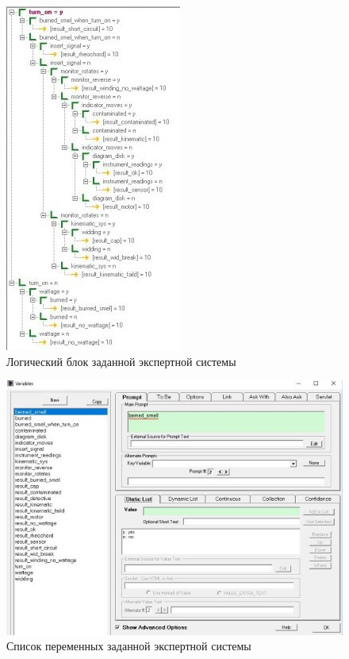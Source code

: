 \documentclass[14pt,a4paper,report]{report}
\begin{document}
\begin{figure}[h!]
	\centering
	\includegraphics[scale = 1.35]{images/1.jpg}
	\caption{Логический блок заданной экспертной системы}
\end{figure}

\clearpage

\begin{figure}[h!]
	\centering
	\includegraphics[scale = 1.35]{images/2.jpg}
	\caption{Список переменных заданной экспертной системы}
\end{figure}

\clearpage
\end{document}
